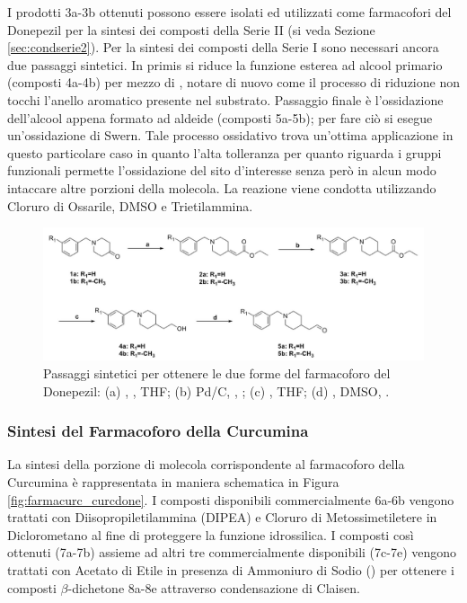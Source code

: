 \documentclass[a4paper, 12pt]{article}
\begin{document}
I prodotti 3a-3b ottenuti possono essere isolati ed utilizzati come farmacofori del Donepezil per la sintesi dei composti della Serie II (si veda Sezione \ref{sec:condserie2}). Per la sintesi dei composti della Serie I sono necessari ancora due passaggi sintetici. In primis si riduce la funzione esterea ad alcool primario (composti 4a-4b) per mezzo di , notare di nuovo come il processo di riduzione non tocchi l'anello aromatico presente nel substrato. Passaggio finale è l'ossidazione dell'alcool appena formato ad aldeide (composti 5a-5b); per fare ciò si esegue un'ossidazione di Swern. Tale processo ossidativo trova un'ottima applicazione in questo particolare caso in quanto l'alta tolleranza per quanto riguarda i gruppi funzionali permette l'ossidazione del sito d'interesse senza però in alcun modo intaccare altre porzioni della molecola. La reazione viene condotta utilizzando Cloruro di Ossarile, DMSO e Trietilammina. \autocite{bruice_chimica_2012}

\begin{figure}[H]
	\centering
	\includegraphics[width=\linewidth]{immagini/farmadone_curcdone.png}
	\caption{Passaggi sintetici per ottenere le due forme del farmacoforo del Donepezil: (a) ,  , THF; (b) Pd/C,  , ; (c)  , THF; (d) , DMSO, .}
	\label{fig:farmadone_curcdone}
\end{figure}

\subsubsection{Sintesi del Farmacoforo della Curcumina}
\label{sec:sintesicurc}
La sintesi della porzione di molecola corrispondente al farmacoforo della Curcumina è rappresentata in maniera schematica in Figura \ref{fig:farmacurc_curcdone}. I composti disponibili commercialmente 6a-6b vengono trattati con Diisopropiletilammina (DIPEA) e Cloruro di Metossimetiletere in Diclorometano al fine di proteggere la funzione idrossilica. I composti così ottenuti (7a-7b) assieme ad altri tre commercialmente disponibili (7c-7e) vengono trattati con Acetato di Etile in presenza di Ammoniuro di Sodio () per ottenere i composti \(\beta\)-dichetone 8a-8e attraverso condensazione di Claisen.
\end{document}
